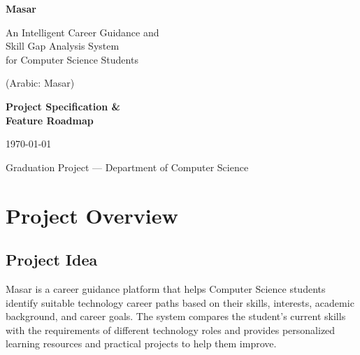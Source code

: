 \documentclass[12pt,a4paper]{article}
\begin{document}
\begin{titlepage}
\centering
\vspace*{2cm}

{\Huge\bfseries\textcolor{masardark}{Masar}\par}
\vspace{0.5cm}
{\LARGE\textcolor{masarblue}{An Intelligent Career Guidance and\\Skill Gap Analysis System\\for Computer Science Students}\par}
\vspace{0.3cm}
{\large\textcolor{masargray}{(Arabic: Masar)}\par}

\vspace{2cm}


\vspace{1cm}
{\Large\bfseries Project Specification \&\\ Feature Roadmap\par}
\vspace{2cm}

{\large\today\par}

\vfill
{\small\textcolor{masargray}{Graduation Project --- Department of Computer Science}}
\end{titlepage}

\tableofcontents
\newpage

\section{Project Overview}

\subsection{Project Idea}
Masar is a career guidance platform that helps Computer Science students identify suitable technology career paths based on their skills, interests, academic background, and career goals. The system compares the student's current skills with the requirements of different technology roles and provides personalized learning resources and practical projects to help them improve.
\end{document}
